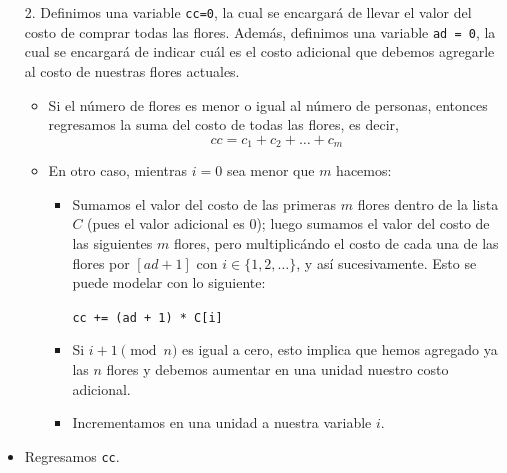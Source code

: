 \documentclass[letterpaper,11pt]{article}
\begin{document}
\begin{enumerate}
\begin{itemize}
        \item[2.] Definimos una variable \texttt{cc=0}, la cual se encargará de 
        llevar el valor del costo de comprar todas las flores. Además, definimos 
        una variable \texttt{ad = 0}, la cual se encargará de indicar cuál es el 
        costo adicional que debemos agregarle al costo de nuestras flores 
        actuales.
        \begin{itemize}
            \item Si el número de flores es menor o igual al número de personas,
            entonces regresamos la suma del costo de todas las flores, es decir, 
            \begin{equation*}
                cc = c_1 + c_2 + \ldots + c_m
            \end{equation*}

            \item En otro caso, mientras $i=0$ sea menor que $m$ hacemos:
            \begin{itemize}
                \item Sumamos el valor del costo de las primeras $m$ flores 
                dentro de la lista $C$ (pues el valor adicional es $0$); luego 
                sumamos el valor del costo de las siguientes $m$ flores, pero
                multiplicándo el costo de cada una de las flores por $[ad + 1]$ 
                con $i \in \{1, 2, \ldots\}$, y así sucesivamente. Esto se 
                puede modelar con lo siguiente:
                \begin{center}
                    \texttt{cc += (ad + 1) * C[i]}
                \end{center}

                \item Si $i+1 \pmod{n}$ es igual a cero, esto implica que hemos 
                agregado ya las $n$ flores y debemos aumentar en una unidad 
                nuestro costo adicional.

                \item Incrementamos en una unidad a nuestra variable $i$.
            \end{itemize}
        \end{itemize}

        \item Regresamos \texttt{cc}.
    \end{itemize}


\end{enumerate}
\end{document}
